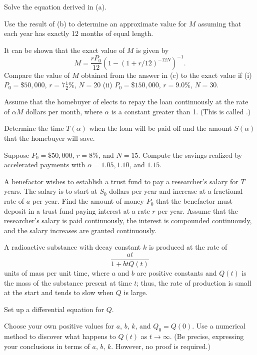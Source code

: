 \begin{exerciselist}
\begin{alist}
\item %
Solve the equation derived in (a).

\item %
 Use the result of (b) to determine an approximate
value for $M$  assuming that each year has exactly 12 months of
equal length.

\item %
 It can be shown that the exact value of $M$  is given by
\[
M=\frac{rP_0}{12}\left(1-(1+r/12)^{-12N}\right)^{-1}.
\]
Compare    the value of $M$ obtained from the answer in (c) to the
exact value  if
 (i) $P_0=\$50,000$, $r=7\frac{1}{2}$\%, $N=20$
 (ii) $P_0=\$150,000$, $r=9.0$\%, $N=30$.
\end{alist}

\item\label{exer:4.1.23}Assume that the homebuyer of  elects to repay the
loan continuously at the rate of $\alpha M$ dollars per month,
where $\alpha$ is a constant greater than 1.
(This is called .)
\begin{alist}
\item %
 Determine the time $T(\alpha)$ when the loan
will be paid off and the amount $S(\alpha)$ that the homebuyer will save.

\item %
 Suppose $P_0=\$50,000$, $r=8$\%, and $N=15$.
Compute
the savings realized by accelerated payments with $\alpha=1.05,1.10$, and
$1.15$.
\end{alist}

\item\label{exer:4.1.24}A benefactor wishes to establish a trust fund to
pay a researcher's salary for $T$ years. The salary is to start at
$S_0$ dollars per year and increase at a fractional rate of $a$ per
year. Find the amount of money $P_0$ that the benefactor must deposit
in a trust fund paying interest at a rate $r$ per year. Assume that
the researcher's salary is paid continuously, the interest is
compounded continuously, and the salary increases are granted
continuously.

\item\label{exer:4.1.25}\Lex
A radioactive substance with decay constant $k$ is produced
at the rate of
\[
\frac{at}{1+btQ(t)}
\]
 units of mass per unit time, where
$a$ and $b$ are positive constants and $Q(t)$ is the mass of the
substance present at time $t$;   thus, the rate of production is small
at the start
 and tends to slow when $Q$ is large.
\begin{alist}
\item %
Set up a differential equation for $Q$.
\item %
Choose your own positive values for $a$, $b$, $k$, and
$Q_0=Q(0)$.
Use a numerical method
to discover what happens to $Q(t)$
as $t\to\infty$. (Be precise, expressing your conclusions in terms of
$a$, $b$, $k$. However,  no proof is required.)
\end{alist}



\end{exerciselist}
